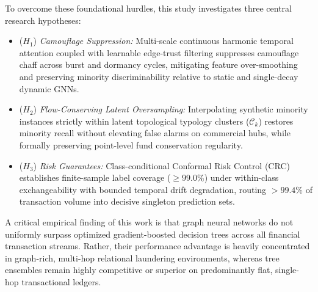 To overcome these foundational hurdles, this study investigates three central research hypotheses:
\begin{itemize}
    \item ($H_1$) \textit{Camouflage Suppression:} Multi-scale continuous harmonic temporal attention coupled with learnable edge-trust filtering suppresses camouflage chaff across burst and dormancy cycles, mitigating feature over-smoothing and preserving minority discriminability relative to static and single-decay dynamic GNNs.
    \item ($H_2$) \textit{Flow-Conserving Latent Oversampling:} Interpolating synthetic minority instances strictly within latent topological typology clusters ($\mathcal{C}_k$) restores minority recall without elevating false alarms on commercial hubs, while formally preserving point-level fund conservation regularity.
    \item ($H_3$) \textit{Risk Guarantees:} Class-conditional Conformal Risk Control (CRC) establishes finite-sample label coverage ($\ge 99.0\%$) under within-class exchangeability with bounded temporal drift degradation, routing $>99.4\%$ of transaction volume into decisive singleton prediction sets.
\end{itemize}

A critical empirical finding of this work is that graph neural networks do not uniformly surpass optimized gradient-boosted decision trees across all financial transaction streams. Rather, their performance advantage is heavily concentrated in graph-rich, multi-hop relational laundering environments, whereas tree ensembles remain highly competitive or superior on predominantly flat, single-hop transactional ledgers.

